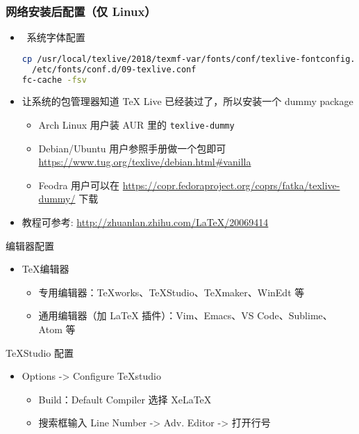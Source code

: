 \begin{frame}[fragile]
  \frametitle{网络安装后配置（仅 Linux）}
  \begin{itemize}
  \item
    \XeTeX\ 系统字体配置
    \begin{lstlisting}[language=bash]
cp /usr/local/texlive/2018/texmf-var/fonts/conf/texlive-fontconfig.conf \
  /etc/fonts/conf.d/09-texlive.conf
fc-cache -fsv
    \end{lstlisting}
  \item 让系统的包管理器知道 TeX Live 已经装过了，所以安装一个 dummy package
    \begin{itemize}
      \item Arch Linux 用户装 AUR 里的 \verb|texlive-dummy|
      \item Debian/Ubuntu 用户参照手册做一个包即可
        \url{https://www.tug.org/texlive/debian.html\#vanilla}
      \item Feodra 用户可以在
        \url{https://copr.fedoraproject.org/coprs/fatka/texlive-dummy/} 下载
    \end{itemize}
  \item 教程可参考: \url{http://zhuanlan.zhihu.com/LaTeX/20069414}
  \end{itemize}
\end{frame}

\begin{frame}{编辑器配置}
  \begin{itemize}
    \item \TeX{}编辑器
      \begin{itemize}
        \item 专用编辑器：TeXworks、\alert{TeXStudio}、TeXmaker、WinEdt 等
        \item 通用编辑器（加 LaTeX 插件）：Vim、Emacs、VS Code、Sublime、Atom 等
      \end{itemize}
  \end{itemize}
  \begin{exampleblock}{TeXStudio 配置}
    \begin{itemize}
      \item Options -> Configure TeXstudio
        \begin{itemize}
          \item Build：Default Compiler 选择 XeLaTeX
          \item 搜索框输入 Line Number -> Adv. Editor -> 打开行号
        \end{itemize}
    \end{itemize}
  \end{exampleblock}
\end{frame}


